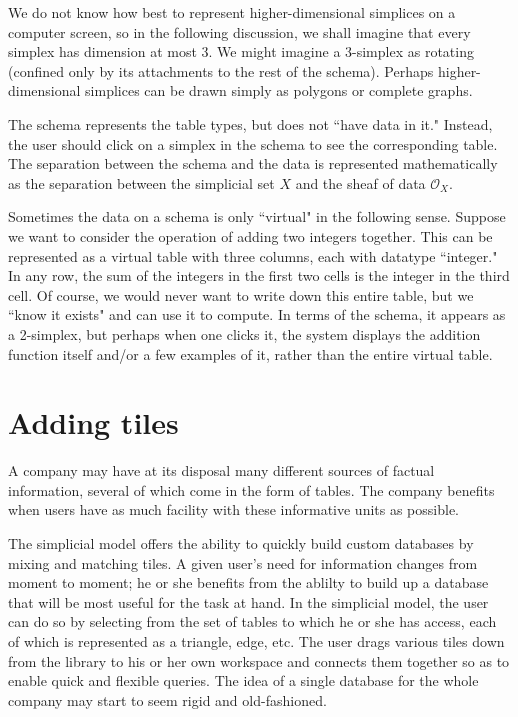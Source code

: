 \documentclass{amsart}
\def\mc{\mathcal}
\def\mcO{\mc{O}}
\theoremstyle{remark}
\theoremstyle{definition}
\begin{document}
We do not know how best  to represent higher-dimensional simplices on a computer screen, so in the following discussion, we shall imagine that every simplex has dimension at most 3.  We might imagine a 3-simplex as rotating (confined only by its attachments to the rest of the schema).  Perhaps higher-dimensional simplices can be drawn simply as polygons or complete graphs.

The schema represents the table types, but does not ``have data in it."  Instead, the user should click on a simplex in the schema to see the corresponding table.  The separation between the schema and the data is represented mathematically as the separation between the simplicial set $X$ and the sheaf of data $\mcO_X$.  

Sometimes the data on a schema is only ``virtual" in the following sense.  Suppose we want to consider the operation of adding two integers together.  This can be represented as a virtual table with three columns, each with datatype ``integer."  In any row, the sum of the integers in the first two cells is the integer in the third cell.  Of course, we would never want to write down this entire table, but we ``know it exists" and can use it to compute.  In terms of the schema, it appears as a 2-simplex, but perhaps when one clicks it, the system displays the addition function itself and/or a few examples of it, rather than the entire virtual table.

\section{Adding tiles}

A company may have at its disposal many different sources of factual information, several of which come in the form of tables.  The company benefits when users have as much facility with these informative units as possible. 

The simplicial model offers the ability to quickly build custom databases by mixing and matching tiles.  A given user's need for information changes from moment to moment; he or she benefits from the ablilty to build up a database that will be most useful for the task at hand.  In the simplicial model, the  user can do so by selecting from the set of tables to which he or she has access, each of which is represented as a triangle, edge, etc.  The user drags various tiles down from the library to his or her own workspace and connects them together so as to enable quick and flexible queries.  The idea of a single database for the whole company may start to seem rigid and old-fashioned. 
\end{document}
